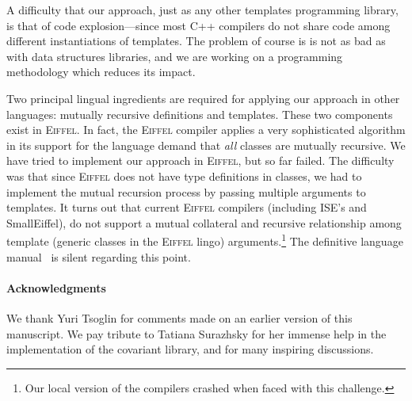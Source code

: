\documentclass[11pt]{article}
\numberwithin{figure}{section}
\newcommand\CC{\Lang{\mbox{C++}}\xspace}
\newcommand\Lang[1]{\textsc{#1}}
\begin{document}
A difficulty that our approach, just as any other templates programming
    library, is that of code explosion---since most \CC compilers do
    not share code among different instantiations of templates.
The problem of course is is not as bad as with data structures libraries,
    and we are working on a programming methodology which reduces
    its impact.


Two principal lingual ingredients are required for applying our approach
    in other languages: mutually recursive definitions and templates.
These two components exist in \Lang{Eiffel}.
In fact, the \Lang{Eiffel} compiler applies a very sophisticated
    algorithm in its support for the language demand that \emph{all}
    classes are mutually recursive.
We have tried to implement our approach in \Lang{Eiffel},
    but so far failed.
The difficulty was that since \Lang{Eiffel} does not have
    type definitions in classes, we had to implement the mutual
    recursion process by passing multiple arguments to templates.
It turns out that current \Lang{Eiffel} compilers (including ISE's and
    SmallEiffel), do not
    support a mutual collateral and recursive relationship
    among template (generic classes in the \Lang{Eiffel} lingo) arguments.\footnote{Our local version of the compilers
    crashed when faced with this challenge.}
The definitive language manual~\cite{Meyer:Book:92} is silent regarding this
    point.



\paragraph{Acknowledgments}
We thank Yuri Tsoglin for comments made on an
    earlier version of this manuscript.
We pay tribute to Tatiana Surazhsky for her immense help
    in the implementation of the covariant library, and for
    many inspiring discussions.




\end{document}
